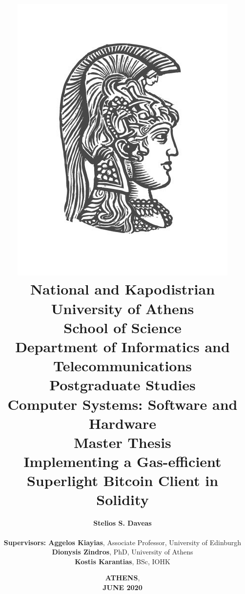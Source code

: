 \title{
    {\includegraphics[scale=0.7]{figures/logo_uoa.jpg}}\\
    {\Large \textbf{National and Kapodistrian University of Athens \\
    School of Science}} \\
    {\large \textbf{Department of Informatics and Telecommunications}}\\
    \vspace{1cm}
    {\large \textbf{Postgraduate Studies}} \\
    {\large \textbf{Computer Systems: Software and Hardware}}\\
    \vspace{5mm}
    {\large \textbf{Master Thesis}}\\
    \vspace{3mm}
    {\textbf{\Large Implementing a Gas-efficient\\Superlight Bitcoin Client in Solidity}}
    }

\author{

    \hspace{-1.5cm}
    \textbf{\normalsize Stelios S. Daveas}\\

    \vspace{0.8cm} \\
    \textbf{\normalsize Supervisors: Aggelos Kiayias}, \normalsize Associate Professor, University of Edinburgh\\
    \hspace{-0.70cm}
    \textbf{\normalsize Dionysis Zindros}, \normalsize PhD, University of Athens\\
    \hspace{-3.50cm}
    \textbf{\normalsize Kostis Karantias}, \normalsize BSc, IOHK
}

\date{\textbf{ATHENS}, \\ \textbf{JUNE 2020}}
